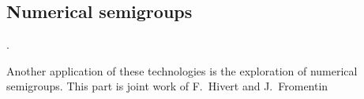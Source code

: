 \documentclass{deliverablereport}
\newcommand{\sgnode}[1]{{\bf \left<#1\right>}}
\newcommand{\gr}[1]{{\color{gray} #1}}
\begin{document}

\subsection{Numerical semigroups}
\label{subsec:numerical-semigroups}.

Another application of these technologies is the exploration of numerical
semigroups. This part is joint work of F.~Hivert and J.~Fromentin~\cite{FromentinH16}

\end{document}
